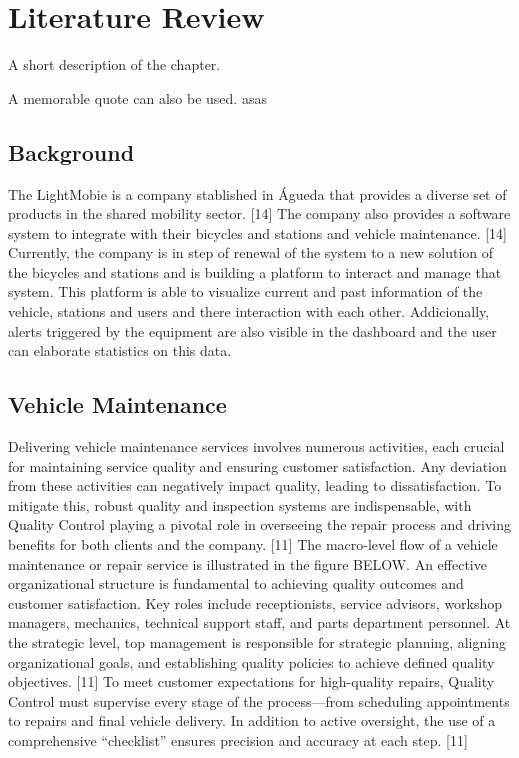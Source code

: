 \chapter{Literature Review}%
\label{chapter:literatureReview}

\begin{introduction}
A short description of the chapter.

A memorable quote can also be used. asas
\end{introduction} 


\section{Background}

The LightMobie is a company stablished in Águeda that provides a diverse set of products in the shared mobility sector. [14]
The company also provides a software system to integrate with their bicycles and stations and vehicle maintenance. [14]
Currently, the company is in step of renewal of the system to a new solution of the bicycles and stations and is building a platform to interact and manage that system.
This platform is able to visualize current and past information of the vehicle, stations and users and there interaction with each other.
Addicionally, alerts triggered by the equipment are also visible in the dashboard and the user can elaborate statistics on this data.

\section{Vehicle Maintenance}

Delivering vehicle maintenance services involves numerous activities, each crucial for maintaining service quality and ensuring customer satisfaction. Any deviation from these activities can negatively impact quality, leading to dissatisfaction. To mitigate this, robust quality and inspection systems are indispensable, with Quality Control playing a pivotal role in overseeing the repair process and driving benefits for both clients and the company. [11]
The macro-level flow of a vehicle maintenance or repair service is illustrated in the figure BELOW. An effective organizational structure is fundamental to achieving quality outcomes and customer satisfaction. Key roles include receptionists, service advisors, workshop managers, mechanics, technical support staff, and parts department personnel. At the strategic level, top management is responsible for strategic planning, aligning organizational goals, and establishing quality policies to achieve defined quality objectives. [11]
To meet customer expectations for high-quality repairs, Quality Control must supervise every stage of the process—from scheduling appointments to repairs and final vehicle delivery. In addition to active oversight, the use of a comprehensive “checklist” ensures precision and accuracy at each step. [11]

